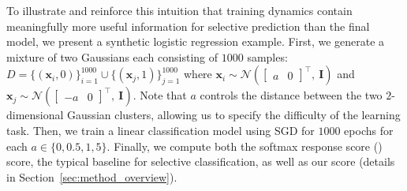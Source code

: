To illustrate and reinforce this intuition that training dynamics contain meaningfully more useful information for selective prediction than the final model, we present a synthetic logistic regression example. First, we generate a mixture of two Gaussians each consisting of $1000$ samples: $D = \{(\bm{x}_i,0)\}_{i=1}^{1000} \cup \{(\bm{x}_j,1)\}_{j=1}^{1000}$ where $\bm{x}_i \sim \mathcal{N}(\begin{bmatrix}a & 0\end{bmatrix}^\top,\ \bm{I})$ and $\bm{x}_j \sim \mathcal{N}(\begin{bmatrix}-a & 0\end{bmatrix}^\top,\ \bm{I})$. 
Note that $a$ controls the distance between the two $2$-dimensional Gaussian clusters, allowing us to specify the difficulty of the learning task. Then, we train a linear classification model using SGD for $1000$ epochs for each $a \in \{0,0.5,1,5\}$. Finally, we compute both the softmax response score (\sr) score, the typical baseline for selective classification, as well as our \sptd score (details in Section~\ref{sec:method_overview}).

